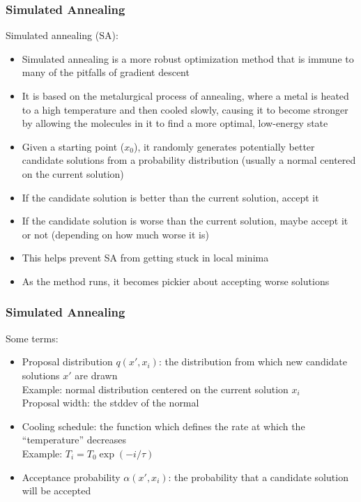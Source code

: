 \documentclass{beamer}
\begin{document}
\begin{frame}	
\end{frame}

\begin{frame}
	\frametitle{Simulated Annealing}
	
	\begin{alertblock}{Simulated annealing (SA):}
		\footnotesize
		\begin{itemize}
			\item Simulated annealing is a more robust optimization method that is immune to many of the pitfalls of gradient descent
			\item It is based on the metalurgical process of annealing, where a metal is heated to a high temperature and then cooled slowly, causing it to become stronger by allowing the molecules in it to find a more optimal, low-energy state
			\item Given a starting point ($x_0$), it randomly generates potentially better candidate solutions from a probability distribution (usually a normal centered on the current solution)
			\item If the candidate solution is better than the current solution, accept it
			\item If the candidate solution is worse than the current solution, maybe accept it or not (depending on how much worse it is)
			\item This helps prevent SA from getting stuck in local minima
			\item As the method runs, it becomes pickier about accepting worse solutions
		\end{itemize}
	\end{alertblock}

\end{frame}

\begin{frame}
	\frametitle{Simulated Annealing}
	
	\begin{block}{Some terms:}
		\begin{itemize}
			\item Proposal distribution $q(x',x_i)$: the distribution from which new candidate solutions $x'$ are drawn \\
			Example: normal distribution centered on the current solution $x_i$ \\
			Proposal width: the stddev of the normal
			\item Cooling schedule: the function which defines the rate at which the ``temperature'' decreases \\
			Example: $T_i = T_0 \exp( -i / \tau )$
			\item Acceptance probability $\alpha(x',x_i)$: the probability that a candidate solution will be accepted
		\end{itemize}
	\end{block}
	
\end{frame}
\end{document}
